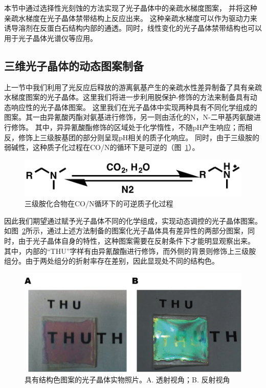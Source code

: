 本节中通过选择性光刻蚀的方法实现了光子晶体中的亲疏水梯度图案，
并将这种亲疏水梯度在光子晶体禁带结构上反应出来。
这种亲疏水梯度可以作为驱动力来诱导溶剂在反蛋白石结构内部的通透\cite{Burgess2012Wetting}。同时，线性变化的光子晶体禁带结构也可以用于光子晶体光谱仪等应用\cite{Ding2014Responsive}。

\subsection{三维光子晶体的动态图案制备}

上一节中我们利用了光反应后释放的游离氨基产生的亲疏水性差异制备了具有亲疏水梯度图案的光子晶体。这里我们将进一步利用脱保护-修饰的方法来制备具有动态响应性的光子晶体图案。
这里我们在光子晶体中实现两种具有不同化学组成的图案。其一由异氰酸丙酯对氨基进行修饰，另一则由活化的N，N-二甲基丙氨酸进行修饰。
其中，异异氰酸酯修饰的区域处于化学惰性，不随pH产生响应；而相反，修饰上三级胺基团的部分则呈现pH相关的质子化响应。
同时，由于三级胺的弱碱性，这种质子化过程在CO/N的循环下是可逆的（图~\ref{fig:reversible-protonation}）\cite{Han2012General}。
\begin{figure}[htbp]
  \centering
  \includegraphics[width=0.5\linewidth]{figures/ch4/tertial-amine.png}
  \caption{三级胺化合物在CO/N循环下的可逆质子化过程}
  \label{fig:reversible-protonation}
\end{figure}

因此我们期望通过赋予光子晶体不同的化学组成，实现动态调控的光子晶体图案。如图~\ref{fig:realsample}所示，通过上述方法制备的图案化光子晶体具有差异性的两部分图案，同时，由于光子晶体自身的特性，这种图案需要在反射条件下才能明显观察出来。
其中，内部的“THU”字样有由异氰酸酯进行修饰，而外侧的背景则修饰上三级胺组分。由于两处组分的折射率存在差别，因此显现处不同的结构色。
\begin{figure}[htbp]
  \centering
  \includegraphics[width=0.8\linewidth]{figures/ch4/realsample.png}
  \caption{具有结构色图案的光子晶体实物照片。A. 透射视角；B. 反射视角}
  \label{fig:realsample}
\end{figure}


